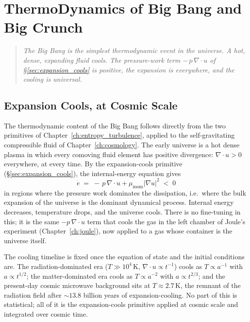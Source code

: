 \chapter{ThermoDynamics of Big Bang and Big Crunch}\label{ch:bigbang}

\small
\begin{quote}\itshape
The Big Bang is the simplest thermodynamic event in the universe.
A hot, dense, expanding fluid cools. The pressure-work term
$-\,p\,\nabla\!\cdot u$ of \S\ref{sec:expansion_cools} is positive, the
expansion is everywhere, and the cooling is universal.
\end{quote}
\normalsize

\section{Expansion Cools, at Cosmic Scale}

The thermodynamic content of the Big Bang follows directly from the
two primitives of Chapter~\ref{ch:entropy_turbulence}, applied to the
self-gravitating compressible fluid of
Chapter~\ref{ch:cosmology}. The early universe is a hot dense plasma
in which every comoving fluid element has positive divergence:
$\nabla\!\cdot u > 0$ everywhere, at every time. By the
expansion-cools primitive (\S\ref{sec:expansion_cools}), the
internal-energy equation gives
\[
  \dot e \;=\; -\,p\,\nabla\!\cdot u + \mu_{\mathrm{mom}}|\nabla u|^2
  \;<\; 0
\]
in regions where the pressure work dominates the dissipation, i.e.\
where the bulk expansion of the universe is the dominant dynamical
process. Internal energy decreases, temperature drops, and the
universe cools. There is no fine-tuning in this; it is the same
$-p\,\nabla\!\cdot u$ term that cools the gas in the left chamber of
Joule's experiment (Chapter~\ref{ch:joule}), now applied to a gas
whose container is the universe itself.

The cooling timeline is fixed once the equation of state and the
initial conditions are. The radiation-dominated era ($T \gg
10^4\,\mathrm{K}$, $\nabla\!\cdot u \propto t^{-1}$) cools as $T
\propto a^{-1}$ with $a \propto t^{1/2}$; the matter-dominated era
cools as $T \propto a^{-2}$ with $a \propto t^{2/3}$; and the
present-day cosmic microwave background sits at $T \approx 2.7\,\mathrm{K}$,
the remnant of the radiation field after $\sim 13.8$ billion years of
expansion-cooling. No part of this is statistical; all of it is the
expansion-cools primitive applied at cosmic scale and integrated over
cosmic time.

